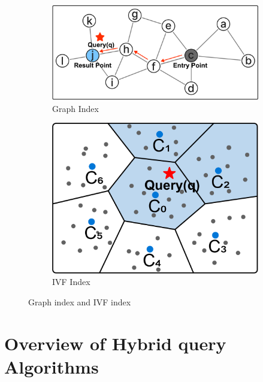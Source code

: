 \documentclass[sigconf, nonacm]{acmart}
\begin{document}
\begin{figure}
    \begin{subfigure}{0.60\columnwidth}
        \centering
       
        \includegraphics[width=\linewidth]{figures/graph.pdf}
        \caption{Graph Index}
        \label{fig:graph}
    \end{subfigure}
    \hfill
    \begin{subfigure}{0.38\columnwidth}
        \centering
      
        \includegraphics[width=\linewidth]{figures/ivf.pdf}
        \caption{IVF Index}
        \label{fig:ivf}
    \end{subfigure}
 
    \setlength{\abovecaptionskip}{0.1cm}
    \setlength{\belowcaptionskip}{0.2cm}
    \caption{Graph index and IVF index}
   
\end{figure}


\section{Overview of Hybrid query Algorithms}
\end{document}

